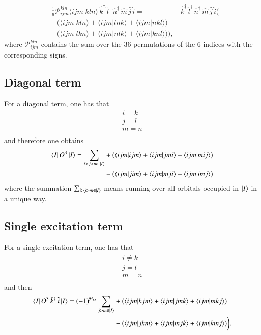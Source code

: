 \documentclass[aip,jcp,reprint,noshowkeys,superscriptaddress]{revtex4-1}
\newcommand{\overlap}[2]{\langle #1 | #2 \rangle}
\newcommand{\opr}[1]{\,\hat{#1}}
\newcommand{\oprd}[1]{\,\hat{#1}^\dagger}
\begin{document}
\begin{equation}
 \begin{aligned}
 & \frac{1}{6} \mathcal{P}_{ijm}^{kln}\overlap{ijm}{kln} \oprd{k} \oprd{l} \oprd{n}  \opr{m} \opr{j} \opr{i}= &\oprd{k} \oprd{l} \oprd{n}  \opr{m} \opr{j} \opr{i} \bigg( \\
 &+ \big( \overlap{ijm}{kln} + \overlap{ijm}{lnk}  + \overlap{ijm}{nkl} \big) \\
 &- \big( \overlap{ijm}{lkn} + \overlap{ijm}{nlk}  + \overlap{ijm}{knl} \big) \bigg),
 \end{aligned}
\end{equation}
where $\mathcal{P}_{ijm}^{kln}$ contains the sum over the 36 permutations of the 6 indices with the corresponding signs. 

\subsection{Diagonal term}
For a diagonal term, one has that 
\begin{equation}
 \begin{aligned}
  i = k \\
  j = l \\
  m = n \\
 \end{aligned}
\end{equation}
and therefore one obtains 
\begin{equation}
 \begin{aligned}
 \bra{I}O^3\ket{I} = \sum_{i>j>m\in \ket{I}}&+ \big(  \overlap{ijm}{ijm} + \overlap{ijm}{jmi}  + \overlap{ijm}{mij} \big) \\
                                 &- \big(  \overlap{ijm}{jim} + \overlap{ijm}{mji}  + \overlap{ijm}{imj} \big)
 \end{aligned}
\end{equation}
where the summation $\sum_{i>j>m\in \ket{I}}$ means running over all orbitals occupied in $\ket{I}$ in a unique way. 
\subsection{Single excitation term}
For a single excitation term, one has that 
\begin{equation}
 \begin{aligned}
  i \ne k \\
  j = l \\
  m = n \\
 \end{aligned}
\end{equation}
and then 
\begin{equation}
 \begin{aligned}
 \bra{I}O^3 \oprd{k} \opr{i} \ket{I} = (-1)^{\mathcal{P}_{IJ}}
 \sum_{j>m\in \ket{I}} 
 &+ \big( \overlap{ijm}{kjm} + \overlap{ijm}{jmk}  + \overlap{ijm}{mkj} \big) \\
 &- \big( \overlap{ijm}{jkm} + \overlap{ijm}{mjk}  + \overlap{ijm}{kmj} \big) \bigg).
 \end{aligned}
\end{equation}
\end{document}
